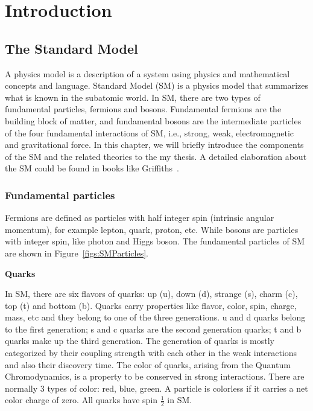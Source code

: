 \chapter{Introduction}
\label{label:chapIntro}

\section{The Standard Model}
A physics model is a description of a system using physics and mathematical concepts and language.
Standard Model (SM) is a physics model that summarizes what is known in the subatomic world. 
In SM, there are 
two types of fundamental particles, fermions and bosons. Fundamental fermions are the building block of matter,
and fundamental bosons are the intermediate particles of the four fundamental interactions of SM, i.e., strong, weak, electromagnetic and
gravitational force. 
In this chapter, we will briefly introduce the components of the SM and the related theories to the my thesis. 
A detailed elaboration about the SM could be found in books like Griffiths~\cite{particlebook1}. 

\subsection{Fundamental particles}

Fermions are defined as particles with half integer spin (intrinsic angular momentum), for example lepton, quark, proton, etc. 
While bosons are particles with integer spin, like photon and Higgs boson.
The fundamental particles of SM are shown in Figure~\ref{figs:SMParticles}. 


{\bf Quarks}

In SM, there are six flavors of quarks: up (u), down (d), strange (s), charm (c), top (t) and bottom (b).  
Quarks carry properties like flavor, color, spin, charge, mass, etc and they belong to one of the three generations. 
u and d quarks belong to the first generation; s and c quarks are the second generation quarks; t and b quarks 
make up the third generation. The generation of quarks is mostly categorized by their coupling strength with each other in 
the weak interactions and also their discovery time.  
The color of quarks, arising from the Quantum Chromodynamics, is a property to be conserved in strong interactions. 
There are normally 3 types of color: red, blue, green. A particle is colorless if it carries a net color 
charge of zero. 
All quarks have spin $\frac{1}{2}$ in SM.  

